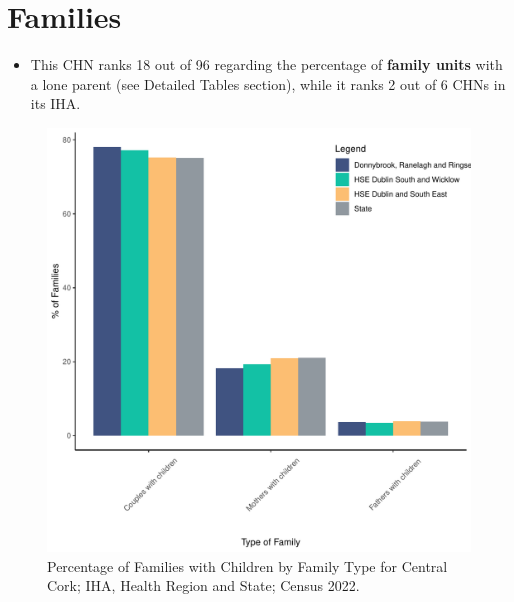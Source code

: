 \documentclass{article}
\begin{document}
\section{Families}\label{sect:Fam}
\begin{itemize}
\item This CHN ranks  18 out of 96 regarding the percentage of \textbf{family units} with a lone parent (see Detailed Tables section), while it ranks   2 out of 6 CHNs in its IHA.
\end{itemize}
\begin{figure}[H]
	\centering
	\includegraphics[width = 150mm]{../figures/FamED.pdf}
	\caption{Percentage of Families with Children by Family Type for Central Cork; IHA, Health Region and State; Census 2022.}
	\label{fig:vbnv}
	\end{figure}
	
\end{document}
